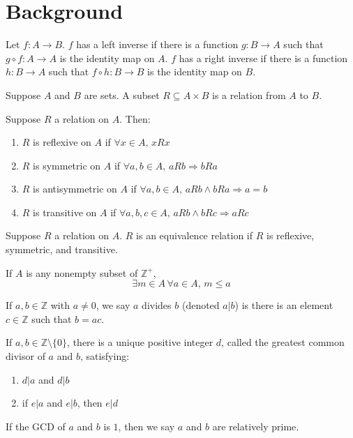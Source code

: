 \documentclass{article}
\begin{document}
\section{Background}
\begin{defi}
	Let \(f:A\rightarrow B\). \(f\) has a left inverse if there is a function \(g:B\rightarrow A\) such that \(g\circ f:A\rightarrow A\) is the identity map on \(A\). \(f\) has a right inverse if there is a function \(h:B\rightarrow A\) such that \(f\circ h:B\rightarrow B\) is the identity map on \(B\).
\end{defi}
\begin{defi}[Relation]
	Suppose \(A\) and \(B\) are sets. A subset \(R\subseteq A\times B\) is a relation from \(A\) to \(B\).
\end{defi}
\begin{defi}
	Suppose \(R\) a relation on \(A\). Then:
	\begin{enumerate}
		\item \(R\) is reflexive on \(A\) if \(\forall x\in A,\,xRx\)
		\item \(R\) is symmetric on \(A\) if \(\forall a,b\in A,\,aRb\Rightarrow bRa\)
		\item \(R\) is antisymmetric on \(A\) if \(\forall a,b\in A,\,aRb\wedge bRa\Rightarrow a=b\)
		\item \(R\) is transitive on \(A\) if \(\forall a,b,c\in A,\,aRb\wedge bRc\Rightarrow aRc\)
	\end{enumerate}
\end{defi}
\begin{defi}
	Suppose \(R\) a relation on \(A\). \(R\) is an equivalence relation if \(R\) is reflexive, symmetric, and transitive.
\end{defi}
\begin{defi}
	If \(A\) is any nonempty subset of \(\mathbb{Z^+}\),
	\begin{equation*}
		\exists m\in A\,\forall a\in A,\,m\leq a
	\end{equation*}
\end{defi}
\begin{defi}[Divisibility]
	If \(a,b\in\mathbb{Z}\) with \(a\neq 0\), we say \(a\) divides \(b\) (denoted \(a|b\)) is there is an element \(c\in\mathbb{Z}\) such that \(b=ac\).
\end{defi}
\begin{defi}[GCD]
	If \(a,b\in\mathbb{Z}\setminus\{0\}\), there is a unique positive integer \(d\), called the greatest common divisor of \(a\) and \(b\), satisfying:
	\begin{enumerate}
		\item \(d|a\) and \(d|b\)
		\item if \(e|a\) and \(e|b\), then \(e|d\)
	\end{enumerate}
	If the GCD of \(a\) and \(b\) is \(1\), then we say \(a\) and \(b\) are relatively prime.
\end{defi}
\end{document}
